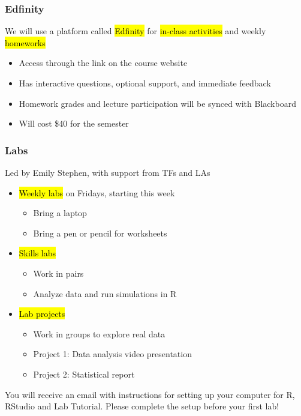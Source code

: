 \documentclass[11pt,containsverbatim,handout]{beamer}
\begin{document}

\begin{frame}
	\frametitle{Edfinity} 
	We will use a platform called \hl{Edfinity} for \hl{in-class activities} and weekly \hl{homeworks}
	\begin{itemize}
		\item Access through the link on the course website
		\item Has interactive questions, optional support, and immediate feedback
		\item Homework grades and lecture participation will be synced with Blackboard
		\item Will cost \$40 for the semester
	\end{itemize}
\end{frame}


\begin{frame}
	\frametitle{Labs} 
	Led by Emily Stephen, with support from TFs and LAs
	\begin{itemize}
		\item \hl{Weekly labs} on Fridays, starting this week
		\begin{itemize}
			\item Bring a laptop
			\item Bring a pen or pencil for worksheets
		\end{itemize}
		\item \hl{Skills labs}
		\begin{itemize}
			\item Work in pairs
			\item Analyze data and run simulations in R
		\end{itemize}
		\item \hl{Lab projects}
		\begin{itemize}
			\item Work in groups to explore real data
			\item Project 1: Data analysis video presentation
			\item Project 2: Statistical report
		\end{itemize}
	\end{itemize}
	You will receive an email with instructions for setting up your computer for R, RStudio and Lab Tutorial. Please complete the setup before your first lab!
\end{frame}

\end{document}
